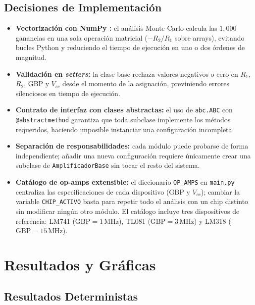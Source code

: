 ﻿\documentclass[12pt, letterpaper]{article}
\begin{document}
\subsection{Decisiones de Implementación}

\begin{itemize}[leftmargin=2em]
    \item \textbf{Vectorización con NumPy \cite{harris2020}:} el análisis Monte Carlo calcula
          las \(1{,}000\) ganancias en una sola operación matricial
          (\(-R_2/R_1\) sobre arrays), evitando bucles Python y reduciendo
          el tiempo de ejecución en uno o dos órdenes de magnitud.
    \item \textbf{Validación en \textit{setters}:} la clase base rechaza
          valores negativos o cero en \(R_1\), \(R_2\), GBP y \(V_{cc}\)
          desde el momento de la asignación, previniendo errores silenciosos
          en tiempo de ejecución.
    \item \textbf{Contrato de interfaz con clases abstractas:} el uso de
          \texttt{abc.ABC} con \texttt{@abstractmethod} garantiza que toda
          subclase implemente los métodos requeridos, haciendo imposible
          instanciar una configuración incompleta.
    \item \textbf{Separación de responsabilidades:} cada módulo puede
          probarse de forma independiente; añadir una nueva configuración
          requiere únicamente crear una subclase de
          \texttt{AmplificadorBase} sin tocar el resto del sistema.
    \item \textbf{Catálogo de op-amps extensible:} el diccionario
          \texttt{OP\_AMPS} en \texttt{main.py} centraliza las
          especificaciones de cada dispositivo (GBP y \(V_{cc}\));
          cambiar la variable \texttt{CHIP\_ACTIVO} basta para repetir
          todo el análisis con un chip distinto sin modificar ningún
          otro módulo. El catálogo incluye tres dispositivos de referencia:
          LM741 (\(\mathrm{GBP} = 1\,\text{MHz}\)),
          TL081 (\(\mathrm{GBP} = 3\,\text{MHz}\)) y
          LM318 (\(\mathrm{GBP} = 15\,\text{MHz}\)).
\end{itemize}

\section{Resultados y Gráficas}

\subsection{Resultados Deterministas}
\end{document}
